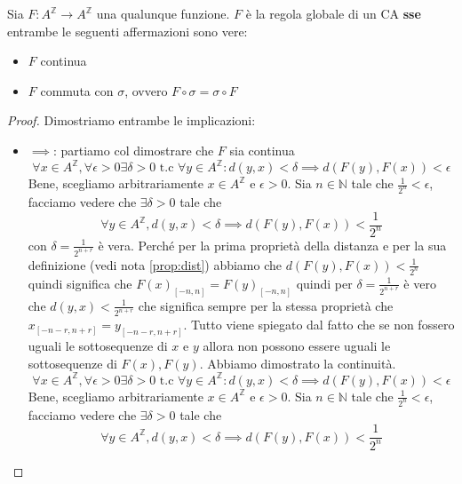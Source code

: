 \begin{teorema}  \label{th:hedlund}
    Sia $F:A^\mathbb{Z}\rightarrow A^\mathbb{Z}$ una qualunque funzione.
    $F$ è la regola globale di un CA \textbf{sse} entrambe le seguenti affermazioni
    sono vere:
    \begin{itemize}
        \item $F$ continua
        \item $F$ commuta con $\sigma$, ovvero $ F\circ\sigma =\sigma \circ F$
    \end{itemize}
    \begin{proof}
        Dimostriamo entrambe le implicazioni:
        \begin{itemize}
            \item $\implies$: partiamo col dimostrare che $F$ sia continua
                  $$\forall x \in A^\mathbb{Z}, \forall \epsilon > 0 \exists \delta> 0 \text{ t.c } \forall y \in A^\mathbb{Z}: d(y, x) < \delta \implies d(F(y), F(x))< \epsilon$$
                  Bene, scegliamo arbitrariamente $x\in  A^\mathbb{Z}$ e $\epsilon >0$.
                  Sia $n\in \mathbb{N}$ tale che $\frac{1}{2^n} < \epsilon $, facciamo vedere
                  che $\exists \delta>0$ tale che
                  $$\forall y\in A^\mathbb{Z}, d(y,x) < \delta \implies d(F(y), F(x))< \frac{1}{2^n}$$
                  con $\delta=\frac{1}{2^{n+r}}$ è vera. Perché per la prima proprietà
                  della distanza e per la sua definizione (vedi nota \ref{prop:dist}) abbiamo che $d(F(y),F(x)) < \frac{1}{2^{n}}$
                  quindi significa che $F(x)_{[-n,n]} = F(y)_{[-n,n]}$ quindi per
                  $\delta=\frac{1}{2^{n+r}}$ è vero che $d(y,x) < \frac{1}{2^{n+r}}$
                  che significa sempre per la stessa proprietà che $x_{[-n-r,n+r]} = y_{[-n-r,n+r]}$.
                  Tutto viene spiegato dal fatto che se non fossero uguali le sottosequenze
                  di $x$ e $y$ allora non possono essere uguali le sottosequenze di $F(x), F(y)$.
                  Abbiamo dimostrato la continuità.
                  $$\forall x \in A^\mathbb{Z}, \forall \epsilon > 0 \exists \delta> 0 \text{ t.c } \forall y \in A^\mathbb{Z}: d(y, x) < \delta \implies d(F(y), F(x))< \epsilon$$
                  Bene, scegliamo arbitrariamente $x\in  A^\mathbb{Z}$ e $\epsilon >0$.
                  Sia $n\in \mathbb{N}$ tale che $\frac{1}{2^n} < \epsilon $, facciamo vedere
                  che $\exists \delta>0$ tale che
                  $$\forall y\in A^\mathbb{Z}, d(y,x) < \delta \implies d(F(y), F(x))< \frac{1}{2^n}$$

\end{itemize}
\end{proof}
\end{teorema}
